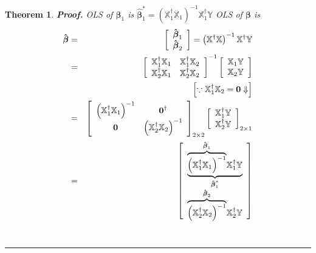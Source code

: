 \documentclass{article}
\newtheorem{theorem}{Theorem}
\newenvironment{proof}[1][Proof]{\noindent\textbf{#1.} }{\ \rule{0.5em}{0.5em}}
\begin{document}
\begin{theorem}
\begin{proof}
OLS of $\boldsymbol{\beta }_{1}$ is $\boldsymbol{\hat{\beta}}_{1}^{\ast
}=\left( \mathbb{X}_{1}^{\dagger }\mathbb{X}_{1}\right) ^{-1}\mathbb{X}%
_{1}^{\dagger }\mathbb{Y}$\newline
OLS of $\boldsymbol{\beta }$ is 
\begin{eqnarray*}
\boldsymbol{\hat{\beta}} &=&\left[ 
\begin{array}{c}
\boldsymbol{\hat{\beta}}_{1} \\ 
\boldsymbol{\hat{\beta}}_{2}%
\end{array}%
\right] =\left( \mathbb{X}^{\dagger }\mathbb{X}\right) ^{-1}\mathbb{X}%
^{\dagger }\mathbb{Y} \\
&=&\left[ 
\begin{array}{cc}
\mathbb{X}_{1}^{\dagger }\mathbb{X}_{1} & \mathbb{X}_{1}^{\dagger }\mathbb{X}%
_{2} \\ 
\mathbb{X}_{2}^{\dagger }\mathbb{X}_{1} & \mathbb{X}_{2}^{\dagger }\mathbb{X}%
_{2}%
\end{array}%
\right] ^{-1}\left[ 
\begin{array}{c}
\mathbb{X}_{1}\mathbb{Y} \\ 
\mathbb{X}_{2}\mathbb{Y}%
\end{array}%
\right]  \\
&&\left[ \because \mathbb{X}_{1}^{\dagger }\mathbb{X}_{2}=\boldsymbol{0}%
\Downarrow \right]  \\
&=&\left[ 
\begin{array}{cc}
\left( \mathbb{X}_{1}^{\dagger }\mathbb{X}_{1}\right) ^{-1} & \boldsymbol{0}%
^{\dagger } \\ 
\boldsymbol{0} & \left( \mathbb{X}_{2}^{\dagger }\mathbb{X}_{2}\right) ^{-1}%
\end{array}%
\right] _{2\times 2}\left[ 
\begin{array}{c}
\mathbb{X}_{1}^{\dagger }\mathbb{Y} \\ 
\mathbb{X}_{2}^{\dagger }\mathbb{Y}%
\end{array}%
\right] _{2\times 1} \\
&=&\left[ 
\begin{array}{c}
\underset{\boldsymbol{\hat{\beta}}_{1}^{\ast }}{\underbrace{\overset{%
\boldsymbol{\hat{\beta}}_{1}}{\overbrace{\left( \mathbb{X}_{1}^{\dagger }%
\mathbb{X}_{1}\right) ^{-1}}}\mathbb{X}_{1}^{\dagger }\mathbb{Y}}} \\ 
\overset{\boldsymbol{\hat{\beta}}_{2}}{\overbrace{\left( \mathbb{X}%
_{2}^{\dagger }\mathbb{X}_{2}\right) ^{-1}}}\mathbb{X}_{2}^{\dagger }\mathbb{%
Y}%
\end{array}%
\right] 
\end{eqnarray*}
\end{proof}
\end{theorem}
\end{document}
